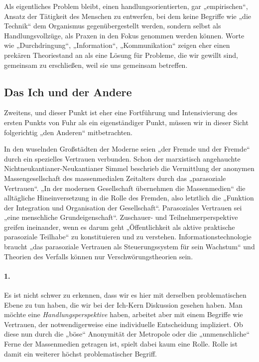 \documentclass[a4paper,11pt]{article}
\begin{document}
Als eigentliches Problem bleibt, einen handlungsorientierten, gar
„empirischen“, Ansatz der Tätigkeit des Menschen zu entwerfen, bei dem keine
Begriffe wie „die Technik“ dem Organismus gegenübergestellt werden, sondern
selbst als Handlungsvollzüge, als Praxen in den Fokus genommen werden
können. Worte wie „Durchdringung“, „Information“, „Kommunikation“ zeigen eher
einen prekären Theoriestand an als eine Lösung für Probleme, die wir gewillt
sind, gemeinsam zu erschließen, weil sie uns gemeinsam betreffen.

\subsection*{Das Ich und der Andere}

Zweitens, und dieser Punkt ist eher eine Fortführung und Intensivierung des
ersten Punkts von Fuhr als ein eigenständiger Punkt, müssen wir in dieser Sicht
folgerichtig „den Anderen“ mitbetrachten.

In den wuselnden Großstädten der Moderne seien „der Fremde und der Fremde“
durch ein spezielles Vertrauen verbunden. Schon der marxistisch angehauchte
Nichtneukantianer-Neukantianer Simmel beschrieb die Vermittlung der anonymen
Massengesellschaft des massenmedialen Zeitalters durch das „parasoziale
Vertrauen“. „In der modernen Gesellschaft übernehmen die Massenmedien“ die
alltägliche Hineinversetzung in die Rolle des Fremden, also letztlich die
„Funktion der Integration und Organisation der Gesellschaft“. Parasoziales
Vertrauen sei „eine menschliche Grundeigenschaft“. Zuschauer- und
Teilnehmerperspektive greifen ineinander, wenn es darum geht „Öffentlichkeit
als aktive praktische parasoziale Teilhabe“ zu konstituieren und zu
verstehen. Informationstechnologie braucht „das parasoziale Vertrauen als
Steuerungssystem für sein Wachstum“ und Theorien des Verfalls können nur
Verschwörungstheorien sein.

\paragraph{1.} 
Es ist nicht schwer zu erkennen, dass wir es hier mit derselben problematischen
Ebene zu tun haben, die wir bei der Ich-Kern Diskussion gesehen haben. Man
möchte eine \emph{Handlungsperspektive} haben, arbeitet aber mit einem Begriffe
wie Vertrauen, der notwendigerweise eine individuelle Entscheidung impliziert.
Ob diese nun durch die „böse“ Anonymität der Metropole oder die „unmenschliche“
Ferne der Massenmedien getragen ist, spielt dabei kaum eine Rolle. Rolle ist
damit ein weiterer höchst problematischer Begriff.
\end{document}
